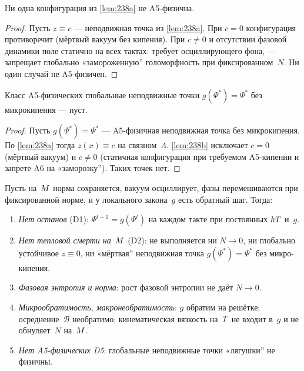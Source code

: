 \begin{lemma}
\label{lem:238b}
Ни одна конфигурация из \cref{lem:238a} не A5-физична.
\end{lemma}

\begin{proof}
Пусть $z\equiv c$ --- неподвижная точка из \cref{lem:238a}.
При $c=0$ конфигурация противоречит  (мёртвый вакуум без кипения).
При $c\ne 0$ и отсутствии фазовой динамики поле статично на всех тактах:
 требует осциллирующего фона,  --- запрещает глобально
«замороженную'' голоморфность при фиксированном~$N$.
Ни один случай не A5-физичен.
\end{proof}

\begin{theorem}
\label{thm:238}
Класс A5-физических глобальные неподвижные точки $g(\Psi^*)=\Psi^*$ без микрокипения --- пуст.
\end{theorem}

\begin{proof}
Пусть $g(\Psi^*)=\Psi^*$ --- A5-физичная неподвижная точка без микрокипения.
По \cref{lem:238a} тогда $z(x)\equiv c$ на связном~$\Lambda$.
\cref{lem:238b} исключает $c=0$ (мёртвый вакуум) и $c\ne 0$ (статичная конфигурация
при требуемом A5-кипении и запрете A6 на «заморозку'').
Таких точек нет.
\end{proof}

\begin{theorem}
\label{thm:main-23}
Пусть на~$M$ норма сохраняется, вакуум осциллирует,
фазы перемешиваются при фиксированной норме, и у локального закона~$g$ есть обратный шаг.
Тогда:
\begin{enumerate}[label=(\roman*)]
\item \emph{Нет останов} (D1): $\Psi^{t+1}=g(\Psi^t)$ на каждом такте при постоянных $hT$ и~$g$.
\item \emph{Нет тепловой смерти на~$M$} (D2): не выполняется ни $N\to 0$,
      ни глобально устойчивое $z\equiv 0$,
      ни «мёртвая'' неподвижная точка $g(\Psi^*)=\Psi^*$ без микро-кипения.
\item \emph{Фазовая энтропия и норма}: рост фазовой энтропии не даёт $N\to 0$.
\item \emph{Микрообратимость, макронеобратимость}: $g$ обратим на решётке;
      осреднение~$\mathcal{B}$ необратимо; кинематическая вязкость на~$T$ не входит в~$g$
      и не обнуляет~$N$ на~$M$.
\item \emph{Нет A5-физических D5}: глобальные неподвижные точки «лягушки'' не физичны.
\end{enumerate}
\end{theorem}

